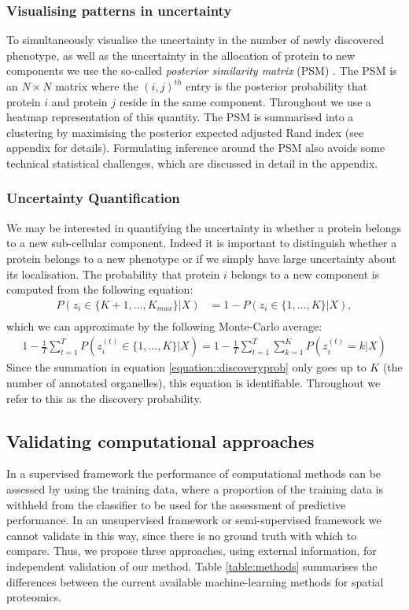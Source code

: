 \documentclass[12pt,english]{article}
\begin{document}
\subsubsection{Visualising patterns in uncertainty}
To simultaneously visualise the uncertainty in the number of newly discovered phenotype, as well as the uncertainty in the allocation of protein to new components we use the so-called \textit{posterior similarity matrix} (PSM) \citep{fritsch::2009}. The PSM is an $N\times N$ matrix where the $(i,j)^{th}$ entry is the posterior probability that protein $i$ and protein $j$ reside in the same component. Throughout we use a heatmap representation of this quantity. The PSM is summarised into a clustering by maximising the posterior expected adjusted Rand index (see appendix for details)\citep{fritsch::2009}. Formulating inference around the PSM also avoids some technical statistical challenges, which are discussed in detail in the appendix.

\subsubsection{Uncertainty Quantification}
We may be interested in quantifying the uncertainty in whether a protein belongs to a new sub-cellular component. Indeed it is important to distinguish whether a protein belongs to a new phenotype or if we simply have large uncertainty about its localisation. The probability that protein $i$ belongs to a new component is computed from the following equation:
\begin{align}
P(z_i \in \{K + 1,..., K_{max}\}|X) & = 1 - P(z_i \in \{1,..., K\}|X), \\ 
\end{align}
which we can approximate by the following Monte-Carlo average:
\begin{align}\label{equation::discoveryprob}
1 - \frac{1}{T} \sum_{t = 1}^{T}P(z^{(t)}_i \in \{1,..., K\}|X)= 1 - \frac{1}{T} \sum_{t = 1}^{T} \sum_{k=1}^KP(z^{(t)}_i = k|X)
\end{align}
Since the summation in equation \ref{equation::discoveryprob} only goes up to $K$ (the number of annotated organelles), this equation is identifiable. Throughout we refer to this as the discovery probability.
\subsection{Validating computational approaches}
In a supervised framework the performance of computational methods can be assessed by 
using the training data, where a proportion of the training data is withheld from the classifier to be used for the assessment of predictive performance. In an unsupervised framework or semi-supervised framework we cannot validate in this way, since there is no ground truth with which to compare. Thus, we propose three approaches, using external information, for independent validation of our method. Table \ref{table:methods} summarises the differences between the current available machine-learning methods for spatial proteomics.
\end{document}
